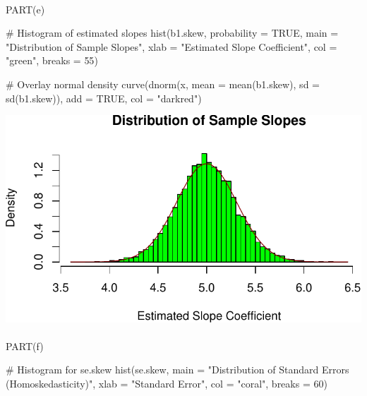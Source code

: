 \documentclass[
  11pt,
]{article}
\makeatletter
\let\oldparagraph\paragraph
\renewcommand{\paragraph}{
    \@ifstar
      \xxxParagraphStar
      \xxxParagraphNoStar
  }
\newcommand{\xxxParagraphStar}[1]{\oldparagraph*{#1}\mbox{}}
\newcommand{\xxxParagraphNoStar}[1]{\oldparagraph{#1}\mbox{}}
\newenvironment{Shaded}{\begin{snugshade}}{\end{snugshade}}
\newcommand{\AttributeTok}[1]{\textcolor[rgb]{0.40,0.45,0.13}{#1}}
\newcommand{\CommentTok}[1]{\textcolor[rgb]{0.37,0.37,0.37}{#1}}
\newcommand{\ConstantTok}[1]{\textcolor[rgb]{0.56,0.35,0.01}{#1}}
\newcommand{\DecValTok}[1]{\textcolor[rgb]{0.68,0.00,0.00}{#1}}
\newcommand{\FunctionTok}[1]{\textcolor[rgb]{0.28,0.35,0.67}{#1}}
\newcommand{\NormalTok}[1]{\textcolor[rgb]{0.00,0.23,0.31}{#1}}
\newcommand{\StringTok}[1]{\textcolor[rgb]{0.13,0.47,0.30}{#1}}
\makeatother
\begin{document}
\paragraph{PART(e)}\label{parte}

\begin{Shaded}
\begin{Highlighting}[]
\CommentTok{\# Histogram of estimated slopes}
\FunctionTok{hist}\NormalTok{(b1.skew, }\AttributeTok{probability =} \ConstantTok{TRUE}\NormalTok{, }
     \AttributeTok{main =} \StringTok{"Distribution of Sample Slopes"}\NormalTok{,}
     \AttributeTok{xlab =} \StringTok{"Estimated Slope Coefficient"}\NormalTok{, }\AttributeTok{col =} \StringTok{"green"}\NormalTok{, }\AttributeTok{breaks =} \DecValTok{55}\NormalTok{)}

\CommentTok{\# Overlay normal density}
\FunctionTok{curve}\NormalTok{(}\FunctionTok{dnorm}\NormalTok{(x, }\AttributeTok{mean =} \FunctionTok{mean}\NormalTok{(b1.skew), }\AttributeTok{sd =} \FunctionTok{sd}\NormalTok{(b1.skew)), }\AttributeTok{add =} \ConstantTok{TRUE}\NormalTok{, }\AttributeTok{col =} \StringTok{"darkred"}\NormalTok{)}
\end{Highlighting}
\end{Shaded}

\includegraphics{HW-4-CODE-and-ANSWERS_files/figure-pdf/unnamed-chunk-12-1.pdf}

\paragraph{PART(f)}\label{partf}

\begin{Shaded}
\begin{Highlighting}[]
\CommentTok{\# Histogram for se.skew}
\FunctionTok{hist}\NormalTok{(se.skew, }
     \AttributeTok{main =} \StringTok{"Distribution of Standard Errors (Homoskedasticity)"}\NormalTok{,}
     \AttributeTok{xlab =} \StringTok{"Standard Error"}\NormalTok{, }\AttributeTok{col =} \StringTok{"coral"}\NormalTok{, }\AttributeTok{breaks =} \DecValTok{60}\NormalTok{)}
\end{Highlighting}
\end{Shaded}
\end{document}
